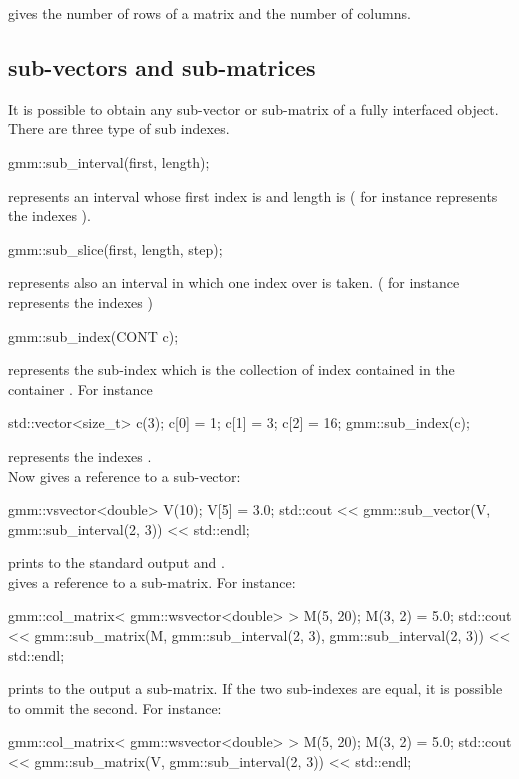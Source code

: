 \documentclass[11pt,a4paper]{article}
\begin{document}
 gives the number of rows of a matrix and  the number of columns.


\subsection{sub-vectors and sub-matrices}
It is possible to obtain any sub-vector or sub-matrix of a fully interfaced object. There are three type of sub indexes.
\begin{cppcode}
  gmm::sub_interval(first, length);
\end{cppcode}
represents an interval whose first index is  and length is  ( for instance  represents the indexes ).
\begin{cppcode}
  gmm::sub_slice(first, length, step);
\end{cppcode}
represents also an interval in which one index over  is taken. ( for instance  represents the indexes )
\begin{cppcode}
  gmm::sub_index(CONT c);
\end{cppcode}
represents the sub-index which is the collection of index contained in the container . For instance
\begin{cppcode}
  std::vector<size_t> c(3);
  c[0] = 1; c[1] = 3; c[2] = 16;
  gmm::sub_index(c);
\end{cppcode}
represents the indexes . \\

Now  gives a reference to a sub-vector:
\begin{cppcode}
  gmm::vsvector<double> V(10);
  V[5] = 3.0;
  std::cout << gmm::sub_vector(V, gmm::sub_interval(2, 3)) << std::endl;  
\end{cppcode}
prints to the standard output  and .\\

 gives a reference to a sub-matrix. For instance:
\begin{cppcode}
  gmm::col_matrix< gmm::wsvector<double> > M(5, 20);
  M(3, 2) = 5.0;
  std::cout << gmm::sub_matrix(M, gmm::sub_interval(2, 3), gmm::sub_interval(2, 3))
            << std::endl;  
\end{cppcode}
prints to the output a sub-matrix. If the two sub-indexes are equal, it is possible to ommit the second. For instance:
\begin{cppcode}
  gmm::col_matrix< gmm::wsvector<double> > M(5, 20);
  M(3, 2) = 5.0;
  std::cout << gmm::sub_matrix(V, gmm::sub_interval(2, 3)) << std::endl;  
\end{cppcode}
\end{document}
